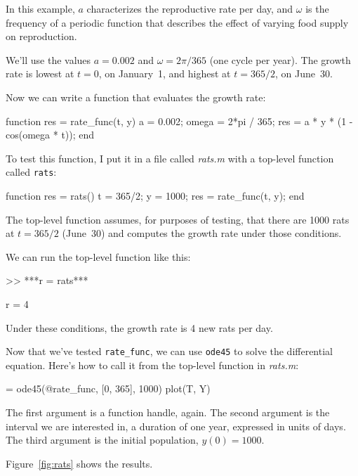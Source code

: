 
In this example, $a$ characterizes the reproductive rate per day, and
$\omega$ is the frequency of a periodic function that describes
the effect of varying food supply on reproduction.

We'll use the values $a = 0.002$
and $\omega = 2 \pi/365$ (one cycle per year).
The growth rate is lowest at $t=0$, on January~1, and highest at $t=365/2$, on June~30.

Now we can write a function that evaluates the growth rate:

\begin{code}
function res = rate_func(t, y)
    a = 0.002;
    omega = 2*pi / 365;
    res = a * y * (1 - cos(omega * t));
end
\end{code}

To test this function, I put it in a file called \emph{rats.m} with a top-level function called 
\lstinline{rats}:

\begin{code}
function res = rats()
    t = 365/2;
    y = 1000;
    res = rate_func(t, y);
end
\end{code}

The top-level function assumes, for purposes of testing, that
there are 1000 rats at $t=365/2$ (June~30) and computes the growth rate under those conditions.

We can run the top-level function like this:

\begin{code}
>> ***r = rats***

r = 4
\end{code}

Under these conditions, the growth rate is 4 new rats per day. 

Now that we've tested \lstinline{rate_func}, we can use \lstinline{ode45} to solve the differential equation.
Here's how to call it from the top-level function in \emph{rats.m}:

\begin{code}
[T, Y] = ode45(@rate_func, [0, 365], 1000)
plot(T, Y)
\end{code}

The first argument is a function handle, again.  The second argument is the interval we are interested in, a duration of one year, expressed in units of days.
The third argument is the initial population, $y(0) = 1000$.


Figure~\ref{fig:rats} shows the results. 

